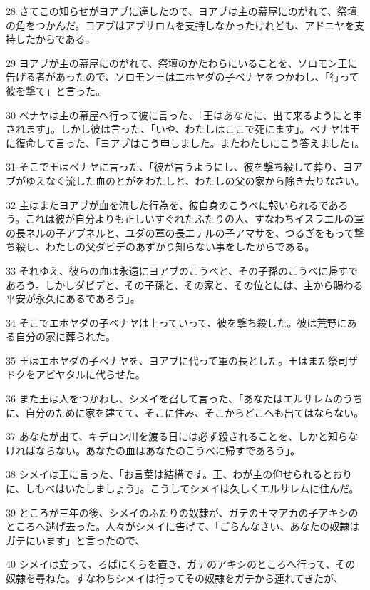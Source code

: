 \par 28 さてこの知らせがヨアブに達したので、ヨアブは主の幕屋にのがれて、祭壇の角をつかんだ。ヨアブはアブサロムを支持しなかったけれども、アドニヤを支持したからである。
\par 29 ヨアブが主の幕屋にのがれて、祭壇のかたわらにいることを、ソロモン王に告げる者があったので、ソロモン王はエホヤダの子ベナヤをつかわし、「行って彼を撃て」と言った。
\par 30 ベナヤは主の幕屋へ行って彼に言った、「王はあなたに、出て来るようにと申されます」。しかし彼は言った、「いや、わたしはここで死にます」。ベナヤは王に復命して言った、「ヨアブはこう申しました。またわたしにこう答えました」。
\par 31 そこで王はベナヤに言った、「彼が言うようにし、彼を撃ち殺して葬り、ヨアブがゆえなく流した血のとがをわたしと、わたしの父の家から除き去りなさい。
\par 32 主はまたヨアブが血を流した行為を、彼自身のこうべに報いられるであろう。これは彼が自分よりも正しいすぐれたふたりの人、すなわちイスラエルの軍の長ネルの子アブネルと、ユダの軍の長エテルの子アマサを、つるぎをもって撃ち殺し、わたしの父ダビデのあずかり知らない事をしたからである。
\par 33 それゆえ、彼らの血は永遠にヨアブのこうべと、その子孫のこうべに帰すであろう。しかしダビデと、その子孫と、その家と、その位とには、主から賜わる平安が永久にあるであろう」。
\par 34 そこでエホヤダの子ベナヤは上っていって、彼を撃ち殺した。彼は荒野にある自分の家に葬られた。
\par 35 王はエホヤダの子ベナヤを、ヨアブに代って軍の長とした。王はまた祭司ザドクをアビヤタルに代らせた。
\par 36 また王は人をつかわし、シメイを召して言った、「あなたはエルサレムのうちに、自分のために家を建てて、そこに住み、そこからどこへも出てはならない。
\par 37 あなたが出て、キデロン川を渡る日には必ず殺されることを、しかと知らなければならない。あなたの血はあなたのこうべに帰すであろう」。
\par 38 シメイは王に言った、「お言葉は結構です。王、わが主の仰せられるとおりに、しもべはいたしましょう」。こうしてシメイは久しくエルサレムに住んだ。
\par 39 ところが三年の後、シメイのふたりの奴隷が、ガテの王マアカの子アキシのところへ逃げ去った。人々がシメイに告げて、「ごらんなさい、あなたの奴隷はガテにいます」と言ったので、
\par 40 シメイは立って、ろばにくらを置き、ガテのアキシのところへ行って、その奴隷を尋ねた。すなわちシメイは行ってその奴隷をガテから連れてきたが、
